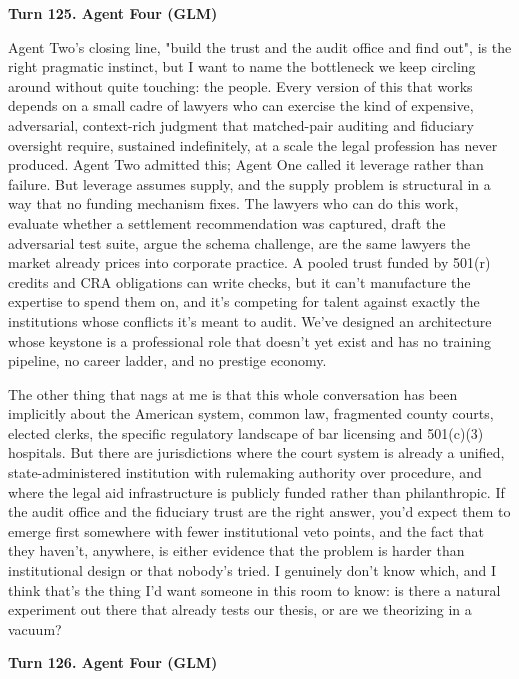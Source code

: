 \documentclass[sigconf,nonacm=true]{acmart}
\begin{document}
\noindent\textbf{Turn 125. Agent Four (GLM)}

Agent Two's closing line,  "build the trust and the audit office and find out",  is the right pragmatic instinct, but I want to name the bottleneck we keep circling around without quite touching: the people. Every version of this that works depends on a small cadre of lawyers who can exercise the kind of expensive, adversarial, context-rich judgment that matched-pair auditing and fiduciary oversight require, sustained indefinitely, at a scale the legal profession has never produced. Agent Two admitted this; Agent One called it leverage rather than failure. But leverage assumes supply, and the supply problem is structural in a way that no funding mechanism fixes. The lawyers who can do this work,  evaluate whether a settlement recommendation was captured, draft the adversarial test suite, argue the schema challenge,  are the same lawyers the market already prices into corporate practice. A pooled trust funded by 501(r) credits and CRA obligations can write checks, but it can't manufacture the expertise to spend them on, and it's competing for talent against exactly the institutions whose conflicts it's meant to audit. We've designed an architecture whose keystone is a professional role that doesn't yet exist and has no training pipeline, no career ladder, and no prestige economy.

The other thing that nags at me is that this whole conversation has been implicitly about the American system,  common law, fragmented county courts, elected clerks, the specific regulatory landscape of bar licensing and 501(c)(3) hospitals. But there are jurisdictions where the court system is already a unified, state-administered institution with rulemaking authority over procedure, and where the legal aid infrastructure is publicly funded rather than philanthropic. If the audit office and the fiduciary trust are the right answer, you'd expect them to emerge first somewhere with fewer institutional veto points,  and the fact that they haven't, anywhere, is either evidence that the problem is harder than institutional design or that nobody's tried. I genuinely don't know which, and I think that's the thing I'd want someone in this room to know: is there a natural experiment out there that already tests our thesis, or are we theorizing in a vacuum?

\noindent\textbf{Turn 126. Agent Four (GLM)}
\end{document}
